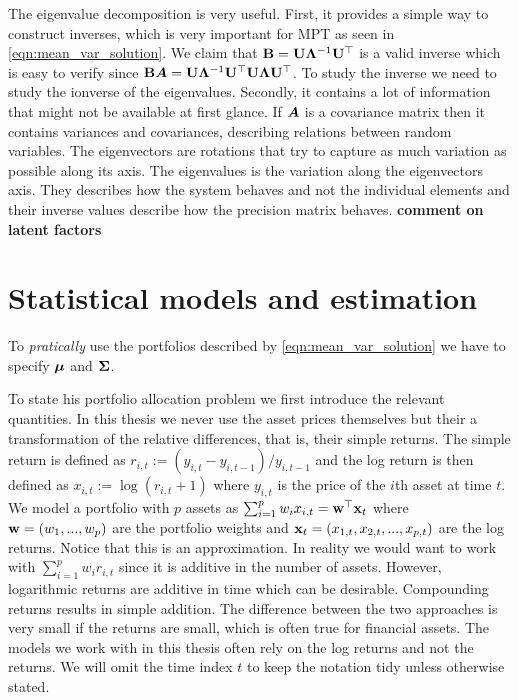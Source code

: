 \documentclass[]{book}\usepackage{knitr}
\begin{document}
The eigenvalue decomposition is very useful.
First, it provides a simple way to construct inverses, which is very important for MPT as seen in \eqref{eqn:mean_var_solution}.
We claim that $\mathbf{B} = \mathbf{U} \boldsymbol{\Lambda}^{-1} \mathbf{U}^{\top}$ is a valid inverse which is easy to verify since $\mathbf{B} \mbox{\boldmath$A$} = \mathbf{U} \boldsymbol{\Lambda}^{-1} \mathbf{U}^{\top} \mathbf{U} \boldsymbol{\Lambda} \mathbf{U}^{\top}$. 
To study the inverse we need to study the ionverse of the eigenvalues.
Secondly, it contains a lot of information that might not be available at first glance. 
If $\mbox{\boldmath$A$}$ is a covariance matrix then it contains variances and covariances, describing relations between random variables. 
The eigenvectors are rotations that try to capture as much variation as possible along its axis.
The eigenvalues is the variation along the eigenvectors axis. 
They describes how the system behaves and not the individual elements and their inverse values describe how the precision matrix behaves.
\textbf{comment on latent factors}

\chapter{Statistical models and estimation}\label{ch:estim}

To \textit{pratically} use the portfolios described by \eqref{eqn:mean_var_solution} we have to specify $\mbox{\boldmath$\mu$}$ and $\mathbf{\Sigma}$.


To state his portfolio allocation problem we first introduce the relevant quantities. In this thesis we never use the asset prices themselves but their a transformation of the relative differences, that is, their simple returns. The simple return is defined as $r_{i,t} := (y_{i,t}-y_{i,t-1})/y_{i,t-1}$ and the log return is then defined as
$
x_{i,t} := \log(r_{i,t} + 1)
$
where $y_{i,t}$ is the price of the $i$th asset at time $t$. We model a portfolio with $p$ assets as $\sum_{i=1}^p w_i x_{i,t} = \mathbf{w}^\top \mathbf{x}_t$ where $\mathbf{w}=(w_1, ..., w_p)$ are the portfolio weights and $\mathbf{x}_t=(x_{1,t},x_{2,t},..., x_{p,t})$ are the log returns. Notice that this is an approximation. In reality we would want to work with $\sum_{i=1}^p w_i r_{i,t}$ since it is additive in the number of assets. However, logarithmic returns are additive in time which can be desirable. Compounding returns results in simple addition. The difference between the two approaches is very small if the returns are small, which is often true for financial assets. The models we work with in this thesis often rely on the log returns and not the returns. We will omit the time index $t$ to keep the notation tidy unless otherwise stated. 
\end{document}
